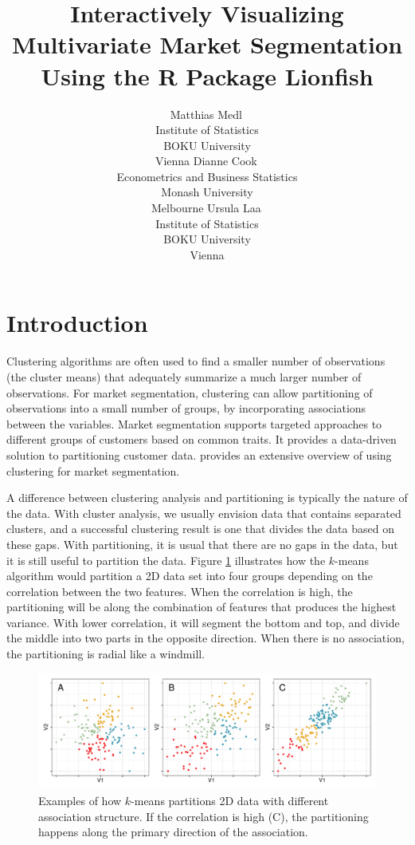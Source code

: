 \documentclass[article]{ajs}
\author{Matthias Medl\,\orcidlink{0000-0002-3354-4579}\\ Institute of Statistics \\ BOKU University \\ Vienna \And 
        Dianne Cook\,\orcidlink{0000-0002-3813-7155}\\ Econometrics and Business Statistics \\ Monash University \\ Melbourne \And
        Ursula Laa\,\orcidlink{0000-0002-0249-6439}\\ Institute of Statistics \\ BOKU University \\ Vienna}
\title{Interactively Visualizing Multivariate Market Segmentation Using the R Package Lionfish}
\begin{document}
\section{Introduction}

Clustering algorithms are often used to find a smaller number of observations (the cluster means) that adequately summarize a much larger number of observations. For market segmentation, clustering can allow partitioning of observations into a small number of groups, by incorporating associations between the variables. Market segmentation supports targeted approaches to different groups of customers based on common traits. It provides a data-driven solution to partitioning customer data. \cite{leisch2018market} provides an extensive overview of using clustering for market segmentation. 

A difference between clustering analysis and partitioning is typically the nature of the data. With cluster analysis, we usually envision data that contains separated clusters, and a successful clustering result is one that divides the data based on these gaps. With partitioning, it is usual that there are no gaps in the data, but it is still useful to partition the data. Figure \ref{kmeans-partition} illustrates how the $k$-means algorithm would partition a 2D data set into four groups depending on the correlation between the two features. When the correlation is high, the partitioning will be along the combination of features that produces the highest variance. With lower correlation, it will segment the bottom and top, and divide the middle into two parts in the opposite direction. When there is no association, the partitioning is radial like a windmill.

\begin{figure}[ht]
\centerline{\includegraphics[width=1\textwidth]{images/intro1.pdf}}
\caption{Examples of how $k$-means partitions 2D data with different association structure. If the correlation is high (C), the partitioning happens along the primary direction of the association.}
\label{kmeans-partition}
\end{figure}
\end{document}
